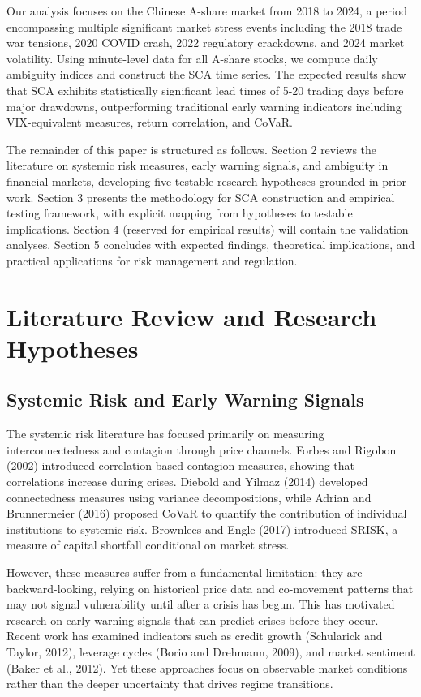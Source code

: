 \documentclass[preprint,12pt,authoryear]{elsarticle}
\begin{document}
Our analysis focuses on the Chinese A-share market from 2018 to 2024, a period encompassing multiple significant market stress events including the 2018 trade war tensions, 2020 COVID crash, 2022 regulatory crackdowns, and 2024 market volatility. Using minute-level data for all A-share stocks, we compute daily ambiguity indices and construct the SCA time series. The expected results show that SCA exhibits statistically significant lead times of 5-20 trading days before major drawdowns, outperforming traditional early warning indicators including VIX-equivalent measures, return correlation, and CoVaR.

The remainder of this paper is structured as follows. Section 2 reviews the literature on systemic risk measures, early warning signals, and ambiguity in financial markets, developing five testable research hypotheses grounded in prior work. Section 3 presents the methodology for SCA construction and empirical testing framework, with explicit mapping from hypotheses to testable implications. Section 4 (reserved for empirical results) will contain the validation analyses. Section 5 concludes with expected findings, theoretical implications, and practical applications for risk management and regulation.

\section{Literature Review and Research Hypotheses}

\subsection{Systemic Risk and Early Warning Signals}

The systemic risk literature has focused primarily on measuring interconnectedness and contagion through price channels. Forbes and Rigobon (2002) introduced correlation-based contagion measures, showing that correlations increase during crises. Diebold and Yilmaz (2014) developed connectedness measures using variance decompositions, while Adrian and Brunnermeier (2016) proposed CoVaR to quantify the contribution of individual institutions to systemic risk. Brownlees and Engle (2017) introduced SRISK, a measure of capital shortfall conditional on market stress.

However, these measures suffer from a fundamental limitation: they are backward-looking, relying on historical price data and co-movement patterns that may not signal vulnerability until after a crisis has begun. This has motivated research on early warning signals that can predict crises before they occur. Recent work has examined indicators such as credit growth (Schularick and Taylor, 2012), leverage cycles (Borio and Drehmann, 2009), and market sentiment (Baker et al., 2012). Yet these approaches focus on observable market conditions rather than the deeper uncertainty that drives regime transitions.
\end{document}
